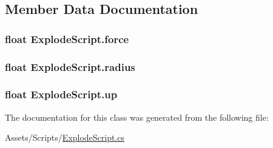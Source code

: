 \subsection{Member Data Documentation}
\hypertarget{class_explode_script_af825236ec0516f880ea50d9bb33c81a1}{}
\subsubsection[{force}]{\setlength{\rightskip}{0pt plus 5cm}float Explode\+Script.\+force}\label{class_explode_script_af825236ec0516f880ea50d9bb33c81a1}
\hypertarget{class_explode_script_ae208b9d0052339eea0edd81f562b481a}{}
\subsubsection[{radius}]{\setlength{\rightskip}{0pt plus 5cm}float Explode\+Script.\+radius}\label{class_explode_script_ae208b9d0052339eea0edd81f562b481a}
\hypertarget{class_explode_script_abc4124d039024e334dd726d85c49396e}{}
\subsubsection[{up}]{\setlength{\rightskip}{0pt plus 5cm}float Explode\+Script.\+up}\label{class_explode_script_abc4124d039024e334dd726d85c49396e}


The documentation for this class was generated from the following file\+:\begin{DoxyCompactItemize}
\item 
Assets/\+Scripts/\hyperlink{_explode_script_8cs}{Explode\+Script.\+cs}\end{DoxyCompactItemize}
